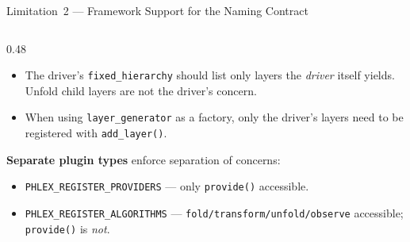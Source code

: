 \documentclass[aspectratio=169,10pt]{beamer}
\newcommand{\warn}[1]{\textcolor{orange!80!black}{\textbf{#1}}}
\newcommand{\code}[1]{\texttt{\small #1}}
\begin{document}
\begin{frame}{Limitation~2 --- Framework Support for the Naming Contract}
\begin{columns}[T]
\begin{column}{0.48\textwidth}
\begin{itemize}
              placed in a header.
        \item[\warn{User}] The driver's \code{fixed\_hierarchy} should
              list only layers the \emph{driver} itself yields.
              Unfold child layers are not the driver's concern.
        \item[\warn{User}] When using \code{layer\_generator} as a
              factory, only the driver's layers need to be registered
              with \code{add\_layer()}.
      \end{itemize}
      \medskip
      \small\textbf{Separate plugin types} enforce separation of concerns:
      \begin{itemize}\small
        \item \code{PHLEX\_REGISTER\_PROVIDERS} ---
              only \code{provide()} accessible.
        \item \code{PHLEX\_REGISTER\_ALGORITHMS} ---
              \code{fold/transform/unfold/observe} accessible;
              \code{provide()} is \emph{not}.
      \end{itemize}
    \end{column}
  \end{columns}
\end{frame}

\end{document}
